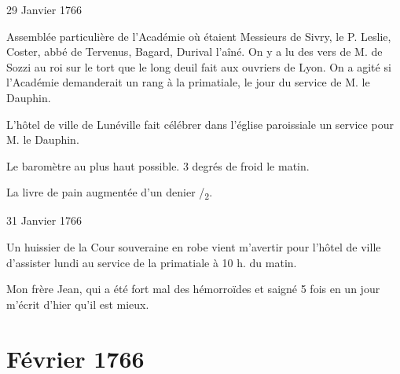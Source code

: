                      \begin{diary}{29 Janvier 1766}{}

                         Assemblée particulière de l'Académie où étaient Messieurs
                           de Sivry, le P.
                              Leslie, Coster,
                              abbé
                              de Tervenus, Bagard, Durival
                           l'aîné. On
                           y a lu des vers de M. de Sozzi
                           au roi sur le
                           tort que le long deuil fait aux ouvriers de Lyon.
                           On a agité si l'Académie
                           demanderait un
                           rang à la primatiale,
                           le jour du service de
                           M. le Dauphin. \bigskip



                           L'hôtel de ville de Lunéville fait célébrer
                           dans l’église
                              paroissiale un service pour M.
                              le Dauphin. \bigskip


                         Le baromètre au plus haut possible.
                           3 degrés de froid
                           le
                           matin. \bigskip


                         La livre de pain augmentée d'un denier
                              /\textsubscript{2}. \bigskip


                     \end{diary}

                     \begin{diary}{31 Janvier 1766}{}

                         Un huissier de la Cour souveraine en robe vient
                           m'avertir pour l'hôtel de ville
                           d'assister lundi
                           au service de la
                              primatiale à 10 h. du matin. \bigskip



                           Mon frère Jean, qui a été
                           fort mal des
                           hémorroïdes et saigné 5 fois en un jour
                           m'écrit d'hier qu'il est mieux. \bigskip


                     \end{diary}
                  \chapter*{Février 1766}



